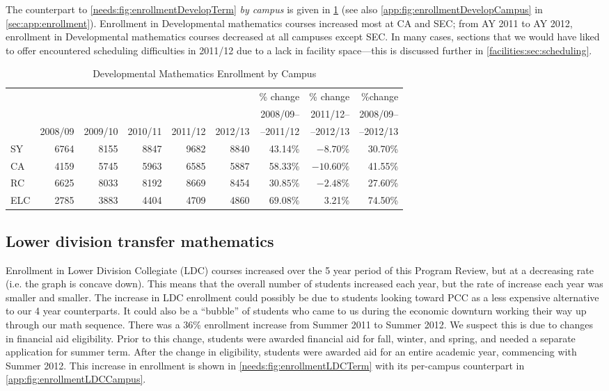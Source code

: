 The counterpart
to \cref{needs:fig:enrollmentDevelopTerm} \emph{by campus} is given in \cref{needs:tab:enrollmentDevelp}
(see also \cref{app:fig:enrollmentDevelopCampus} in \vref{sec:app:enrollment}).
Enrollment in Developmental mathematics courses increased most
at CA and SEC; from AY 2011 to AY 2012, enrollment in Developmental mathematics courses
decreased at all campuses except SEC. In many cases,
sections that we would have liked to offer encountered scheduling difficulties in 2011/12 due to a lack
in facility space---this is discussed further in  \vref{facilities:sec:scheduling}.

\begin{table}[!htb]
	\centering
	\caption{Developmental Mathematics Enrollment by Campus}
	\label{needs:tab:enrollmentDevelp}
	\begin{tabularx}{\linewidth}{X*{7}rr}
		\toprule
		    &         &         &         &         &         & \% change & \% change  & \%change  \\
		    &         &         &         &         &         & 2008/09-- & 2011/12--  & 2008/09-- \\
		    & 2008/09 & 2009/10 & 2010/11 & 2011/12 & 2012/13 & --2011/12 & --2012/13  & --2012/13 \\
		\midrule
		SY  & 6764    & 8155    & 8847    & 9682    & 8840    & 43.14\%   & $-8.70\%$  & 30.70\%   \\
		CA  & 4159    & 5745    & 5963    & 6585    & 5887    & 58.33\%   & $-10.60\%$ & 41.55\%   \\
		RC  & 6625    & 8033    & 8192    & 8669    & 8454    & $30.85\%$ & $-2.48\%$  & 27.60\%   \\
		ELC & 2785    & 3883    & 4404    & 4709    & 4860    & $69.08\%$ & 3.21\%     & 74.50\%   \\
		\bottomrule
	\end{tabularx}
\end{table}

\subsection{Lower division transfer mathematics}
Enrollment in Lower Division Collegiate (LDC) courses increased over the 5
year period of this Program Review, but at a decreasing rate (i.e. the graph is
concave down). This means that the overall number of students increased each
year, but the rate of increase each year was smaller and smaller. The increase
in LDC enrollment could possibly be due to students looking toward PCC as a
less expensive alternative to our 4 year counterparts. It could also be a
``bubble'' of students who came to us during the economic downturn working
their way up through our math sequence.  There was a 36\% enrollment increase
from Summer 2011 to Summer 2012. We suspect this is due to
changes in financial aid eligibility. Prior to this change, students were
awarded financial aid for fall, winter, and spring, and needed a separate
application for summer term.  After the change in eligibility, students were
awarded aid for an entire academic year, commencing with Summer 2012.
This increase in enrollment is shown in \cref{needs:fig:enrollmentLDCTerm} with
its per-campus counterpart in \vref{app:fig:enrollmentLDCCampus}.


